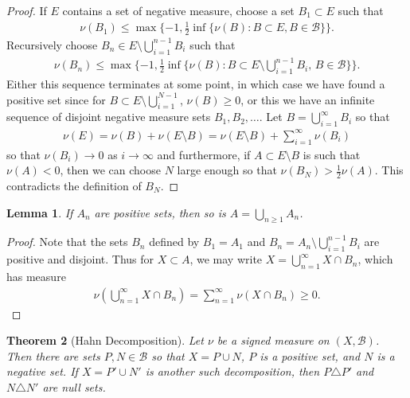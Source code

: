 \documentclass[11pt]{amsart}
\newtheorem{theorem}{Theorem}[section]
\newtheorem{lemma}[theorem]{Lemma}
\theoremstyle{definition}
\numberwithin{equation}{section}
\begin{document}
\begin{proof}
    If $E$ contains a set of negative measure, choose a set $B_1\subset E$ such that 
    \begin{align*}
        \nu(B_1)\le \max\{-1,\frac{1}{2}\inf\{\nu(B):B\subset E,B\in\mathcal B\}\}.
    \end{align*}
    Recursively choose $B_n\in E\setminus \bigcup_{i=1}^{n-1}B_i$ such that
    \begin{align*}
        \nu(B_n)\le \max\{-1,\frac{1}{2}\inf\{\nu(B):B\subset E\setminus\bigcup_{i=1}^{n-1}B_i,\,B\in\mathcal B\}\}.
    \end{align*}
    Either this sequence terminates at some point, in which case we have found a positive set since for $B\subset E\setminus\bigcup_{i=1}^{N-1}$, $\nu(B)\ge 0$, or this we have an infinite sequence of disjoint negative measure sets $B_1,B_2,\ldots$. Let $B=\bigcup_{i=1}^\infty B_i$ so that
    \begin{align*}
        \nu(E)=\nu(B)+\nu(E\setminus B)=\nu(E\setminus B)+\sum_{i=1}^\infty\nu(B_i)
    \end{align*}
    so that $\nu(B_i)\to 0$ as $i\to\infty$ and furthermore, if $A\subset E\setminus B$ is such that $\nu(A)<0$, then we can choose $N$ large enough so that $\nu(B_N)>\frac{1}{2}\nu(A)$. This contradicts the definition of $B_N$.
\end{proof}
\begin{lemma}
    If $A_n$ are positive sets, then so is $A=\bigcup_{n\ge 1}A_n$.
\end{lemma}
\begin{proof}
    Note that the sets $B_n$ defined by $B_1=A_1$ and $B_n=A_n\setminus\bigcup_{i=1}^{n-1}B_i$ are positive and disjoint. Thus for $X\subset A$, we may write $X=\bigcup_{n=1}^\infty X\cap B_n$, which has measure
    \begin{align*}
        \nu(\bigcup_{n=1}^\infty X\cap B_n)=\sum_{n=1}^\infty \nu(X\cap B_n)\ge 0.
    \end{align*}
\end{proof}
\begin{theorem}[Hahn Decomposition]
    Let $\nu$ be a signed measure on $(X,\mathcal B)$. Then there are sets $P,N\in\mathcal B$ so that $X=P\cup N$, $P$ is a positive set, and $N$ is a negative set. If $X=P'\cup N'$ is another such decomposition, then $P\triangle P'$ and $N\triangle N'$ are null sets.
\end{theorem}
\end{document}
